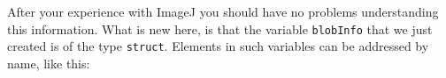 After your experience with ImageJ you should have no problems understanding this information.
What is new here, is that the variable \lstinline{blobInfo} that we just created is of the type \lstinline{struct}.  Elements in such variables can be addressed by name, like this: